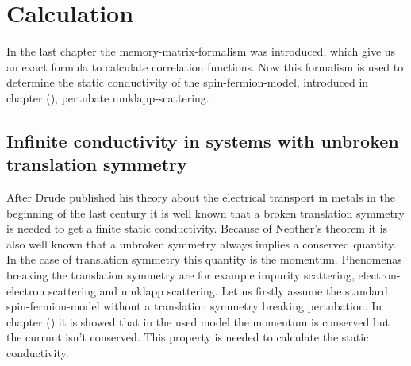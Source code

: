 \chapter{Calculation}
\label{ch: calculation}

In the last chapter the memory-matrix-formalism was introduced, which give us an exact formula to calculate correlation functions.
Now this formalism is used to determine the static conductivity of the spin-fermion-model, introduced in chapter (), pertubate umklapp-scattering.


\section{Infinite conductivity in systems with unbroken translation symmetry}
\label{sec: Infinite conductivity in a system with unbroken translation symmetry}
%
%
After Drude published his theory about the electrical transport in metals \cite{Drude} in the beginning of the last century it is well known that a broken translation symmetry is needed to get a finite static conductivity.
Because of Neother's theorem it is also well known that a unbroken symmetry always implies a conserved quantity.
In the case of translation symmetry this quantity is the momentum.
Phenomenas breaking the translation symmetry are for example impurity scattering, electron-electron scattering and umklapp scattering.
Let us firstly assume the standard spin-fermion-model without a translation symmetry breaking pertubation.
In chapter () it is showed that in the used model the momentum is conserved but the currunt isn't conserved.
This property is needed to calculate the static conductivity.

